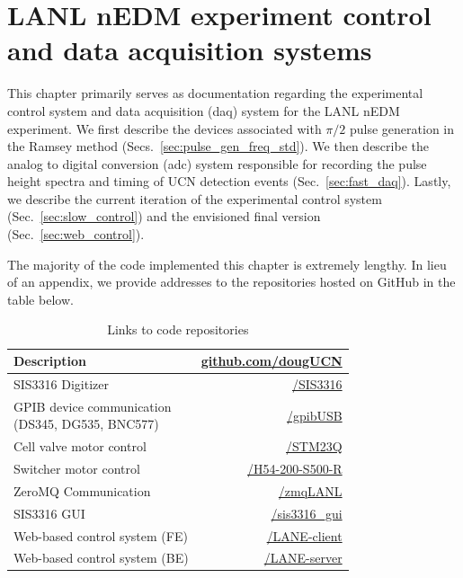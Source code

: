 
\chapter{LANL nEDM experiment control and data acquisition systems}\label{chap:daq}


This chapter primarily serves as documentation regarding the experimental control system and data acquisition (\acrshort*{daq}) system for the LANL nEDM experiment. We first describe the devices associated with $\pi/2$ pulse generation in the Ramsey method (Secs.~\ref{sec:pulse_gen_freq_std}). We then describe the analog to digital conversion (\acrshort*{adc}) system responsible for recording the pulse height spectra and timing of UCN detection events (Sec.~\ref{sec:fast_daq}). Lastly, we describe the current iteration of the experimental control system (Sec.~\ref{sec:slow_control}) and the envisioned final version (Sec.~\ref{sec:web_control}).

The majority of the code implemented this chapter is extremely lengthy. In lieu of an appendix, we provide addresses to the repositories hosted on GitHub in the table below.

\begin{table}[htp]
\renewcommand*{\arraystretch}{2}
\centering
\caption{Links to code repositories}\label{tb:github}
\begin{tabular}{
    l
    r
}
\toprule
Description & \href{https://github.com/dougUCN/}{github.com/dougUCN} \\
\midrule
SIS3316 Digitizer  & \href{https://github.com/dougUCN/SIS3316}{/SIS3316} \\
\makecell[l]{GPIB device communication\\(DS345, DG535, BNC577)} & \href{https://github.com/dougUCN/gpibUSB}{/gpibUSB} \\
Cell valve motor control & \href{https://github.com/dougUCN/STM23Q}{/STM23Q} \\
Switcher motor control &  \href{https://github.com/dougUCN/H54-200-S500-R}{/H54-200-S500-R} \\
ZeroMQ Communication & \href{https://github.com/dougUCN/zmqLANL}{/zmqLANL} \\
SIS3316 GUI & \href{https://github.com/dougUCN/sis3316_gui}{/sis3316\_gui} \\
Web-based control system (FE) & \href{https://github.com/dougUCN/LANE-client}{/LANE-client} \\
Web-based control system (BE) & \href{https://github.com/dougUCN/LANE-server}{/LANE-server} \\
\bottomrule
\end{tabular}
\end{table}


